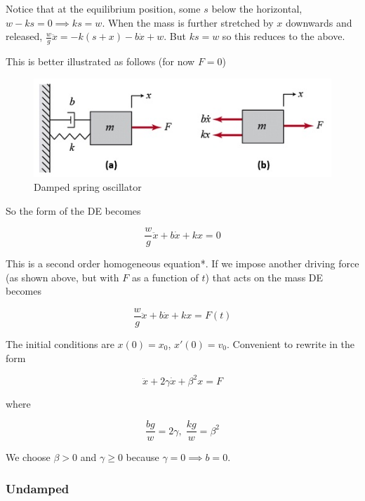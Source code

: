 Notice that at the equilibrium position, some $s$ below the horizontal, $w-ks=0\implies ks=w$.
When the mass is further stretched by $x$ downwards and released, $\frac{w}{g}\ddot x=-k(s+x)-b\dot x+w$.
But $ks=w$ so this reduces to the above.

This is better illustrated as follows (for now $F=0$)

\begin{figure}[H]
    \centering
    \includegraphics[scale=0.6]{figures/a-Mass-Spring-Damper-System-b-free-body-diagram.jpg}
    \caption{Damped spring oscillator}
\end{figure}

So the form of the DE becomes

\begin{equation*}
    \frac{w}{g}\ddot x+b\dot x+kx=0
\end{equation*}

This is a second order homogeneous equation*. If we impose another driving force (as shown above, but with $F$ as a function of $t$) that acts on the mass DE becomes

\begin{equation*}
    \frac{w}{g}\ddot x+b\dot x+kx=F(t)
\end{equation*}

The initial conditions are $x(0)=x_0$, $x'(0)=v_0$. Convenient to rewrite in the form

\begin{equation*}
    \ddot x+2\gamma \dot x+\beta^2 x = F
\end{equation*}

where

\begin{equation*}
    \frac{bg}{w}=2\gamma,\; \frac{kg}{w}=\beta^2
\end{equation*}

We choose $\beta>0$ and $\gamma \geq 0$ because $\gamma = 0\implies b=0$.

\subsubsection{Undamped}

